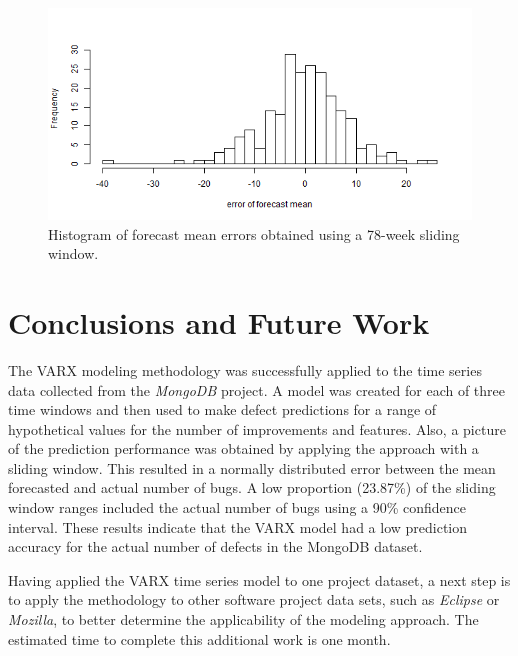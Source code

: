 \documentclass[letterpaper]{report}
\begin{document}
\begin{figure}[htbp]
\centering
\includegraphics[width=\textwidth]{assets/forecast_errors}
\caption[Forecast errors]{Histogram of forecast mean errors obtained using a 78-week sliding window.}
\label{fig:forecast_errors}
\end{figure}

\chapter{Conclusions and Future Work}
\label{sec:conclusions}
The VARX modeling methodology was successfully applied to the time series data collected from the \textit{MongoDB} project. A model was created for each of three time windows and then used to make defect predictions for a range of hypothetical values for the number of improvements and features. Also, a picture of the prediction performance was obtained by applying the approach with a sliding window. This resulted in a normally distributed error between the mean forecasted and actual number of bugs. A low proportion (23.87\%) of the sliding window ranges included the actual number of bugs using a 90\% confidence interval. These results indicate that the VARX model had a low prediction accuracy for the actual number of defects in the MongoDB dataset.

Having applied the VARX time series model to one project dataset, a next step is to apply the methodology to other software project data sets, such as \textit{Eclipse} or \textit{Mozilla}, to better determine the applicability of the modeling approach. The estimated time to complete this additional work is one month. 

%
\end{document}
